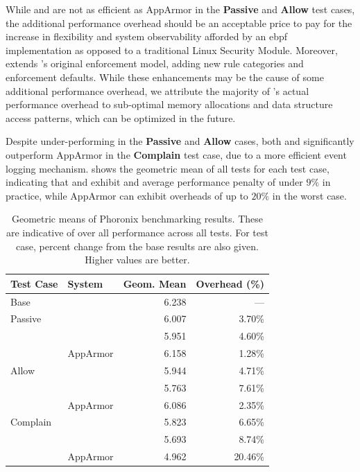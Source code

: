 While \bpfbox{} and \bpfcontain{} are not as efficient as AppArmor in the \textbf{Passive}
and \textbf{Allow}  test cases, the additional performance overhead should be an
acceptable price to pay for the increase in flexibility and system observability afforded
by an \gls{ebpf} implementation as opposed to a traditional Linux Security Module.
Moreover, \bpfcontain{} extends \bpfbox{}'s original enforcement model, adding new rule categories
and enforcement defaults. While these enhancements may be the cause of some additional
performance overhead, we attribute the majority of \bpfcontain{}'s actual performance
overhead to sub-optimal memory allocations and data structure access patterns, which can
be optimized in the future.

Despite under-performing in the \textbf{Passive} and \textbf{Allow} cases, both \bpfbox{}
and \bpfcontain{} significantly outperform AppArmor in the \textbf{Complain} test case,
due to a more efficient event logging mechanism.   shows the
geometric mean of all tests for each test case, indicating that \bpfbox{} and
\bpfcontain{} exhibit and average performance penalty of under $9\%$ in practice, while
AppArmor can exhibit overheads of up to $20\%$ in the worst case.

\begin{table}[htp]
  \centering
  \caption[Geometric means of Phoronix benchmarking results]{
    Geometric means of Phoronix benchmarking results. These are indicative of over all
    performance across all tests. For test case, percent change from the base results are
    also given. Higher values are better.
  }%
  \label{tab:phoronix-geometric}
  \begin{tabular}{llrr}
  \toprule
   Test Case & System        & Geom. Mean & Overhead (\%)\\
   \midrule
   Base      &               & 6.238          & --- \\
   \midrule
   Passive   & \bpfbox{}     & 6.007          & 3.70\% \\
             & \bpfcontain{} & 5.951          & 4.60\% \\
             & AppArmor      & 6.158          & 1.28\% \\
   \midrule
   Allow     & \bpfbox{}     & 5.944          & 4.71\% \\
             & \bpfcontain{} & 5.763          & 7.61\% \\
             & AppArmor      & 6.086          & 2.35\% \\
   \midrule
   Complain  & \bpfbox{}     & 5.823          & 6.65\% \\
             & \bpfcontain{} & 5.693          & 8.74\% \\
             & AppArmor      & 4.962          & 20.46\% \\
  \bottomrule
  \end{tabular}
\end{table}

